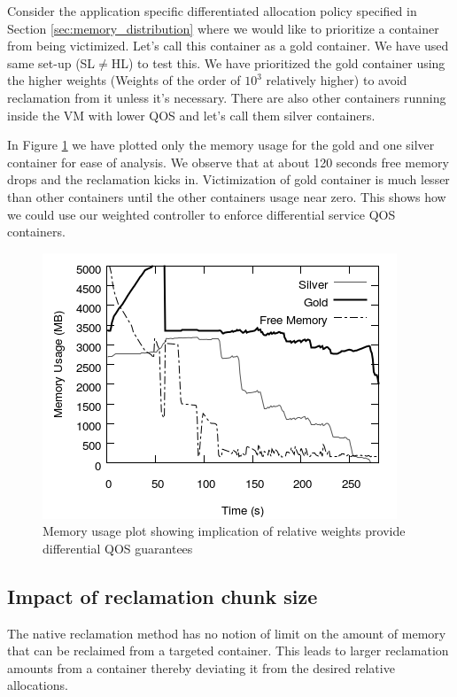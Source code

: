      Consider the application specific differentiated allocation policy specified in Section 
\ref{sec:memory_distribution} where we would like to prioritize a container from being 
victimized. Let's call this container as a gold container. We have used same set-up 
(SL$\neq$HL) to test this. We have prioritized the gold container using the higher weights 
(Weights of the order of $10^{3}$ relatively higher) to avoid reclamation from it unless it's necessary.
There are also other containers running inside the VM with lower QOS and let's call them silver containers.

In Figure \ref{priority_cont} we have plotted only the memory usage for the gold and one silver container for ease of analysis. We 
observe that at about 120 seconds free memory drops and the reclamation kicks in. Victimization of gold container is much lesser than other 
containers until the other containers usage near zero. This shows how we could use our weighted controller to enforce differential 
service QOS containers.

\begin{figure}
  \centering
  \includegraphics[scale=0.6]{images/mem_sol/gold/memory_usage.png}
  \caption{Memory usage plot showing implication of relative weights provide differential QOS guarantees}
  \label{priority_cont}
\end{figure}
    
    \subsection{Impact of reclamation chunk size}
    
    
    The native reclamation method has no notion of limit on the
amount of memory that can be reclaimed from a targeted container. This leads to larger 
reclamation amounts from a container thereby deviating it from the desired relative 
allocations.

